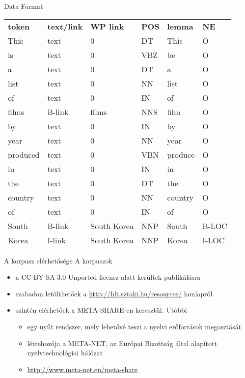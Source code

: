 \documentclass[utf8x,t]{beamer}
\newcommand{\vitem}{\item \vspace{4pt}}
\begin{document}
\begin{frame}{Data Format}

\begin{tabular}{llllll}
\textbf{token} & \textbf{text/link} & \textbf{WP link} & \textbf{POS} & \textbf{lemma} & \textbf{NE} \\
This & text & 0 &    DT &   This & O \\
is &   text & 0 &    VBZ &  be &   O \\
a &    text & 0 &    DT &   a  &    O\\
list & text & 0 &    NN &   list  & O\\
of &   text & 0 &    IN &   of &     O\\
films  & B-link & films &  NNS &  film & O\\
by &   text & 0 &    IN &   by &     O\\
year & text & 0 &    NN &   year & O\\
produced & text & 0 &    VBN &  produce & O\\
in &   text & 0 &    IN &   in &     O\\
the &  text & 0 &    DT &   the &   O\\
country &text & 0 &    NN &   country &O\\
of &   text & 0 &    IN &   of &     O\\
South &  B-link & South Korea &  NNP &  South  &B-LOC\\
Korea &  I-link & South Korea &  NNP &  Korea   & I-LOC\\
\end{tabular}

\end{frame}

\begin{frame}{A korpusz elérhetősége}
\bigskip
A korpuszok
\begin{itemize}
\vitem a CC-BY-SA 3.0 Unported licensz alatt kerültek publikálásra
\vitem szabadon letölthetőek a \url{http://hlt.sztaki.hu/resources/} honlapról
\vitem szintén elérhetőek a META-SHARE-en keresztül. Utóbbi
  \begin{itemize}
  \vitem egy nyílt rendszer, mely lehetővé teszi a nyelvi erőforrások megosztását
  \vitem létrehozója a META-NET, az Európai Bizottság által alapított nyelvtechnológiai hálózat
  \vitem \url{http://www.meta-net.eu/meta-share}
  \end{itemize}
\end{itemize}

\end{frame}
\end{document}
